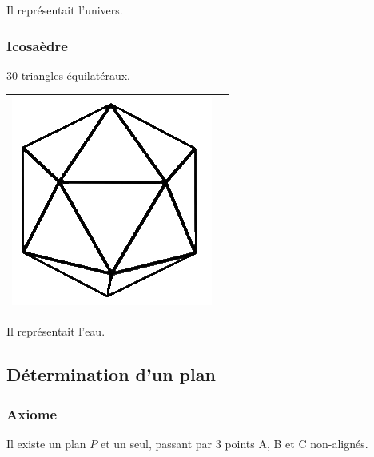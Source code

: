 Il représentait l'univers.

\subsubsection{Icosaèdre}

30 triangles équilatéraux.

\begin{center}

\begin{tabular}{cc}
 \includegraphics[width=.3\textwidth]{icosaedre.jpg}& 
\raisebox{10ex}{\parbox{4cm}{
        \begin{itemize}
            \item[*] $S = 12$
            \item[*] $F = 20$
            \item[*] $A = 30$
        \end{itemize}}}
\end{tabular}
\end{center}

Il représentait l'eau.

\subsection{Détermination d'un plan}

\subsubsection{Axiome }

Il existe un plan $P$ et un seul, passant par 3 points A, B et C non-alignés. \\


